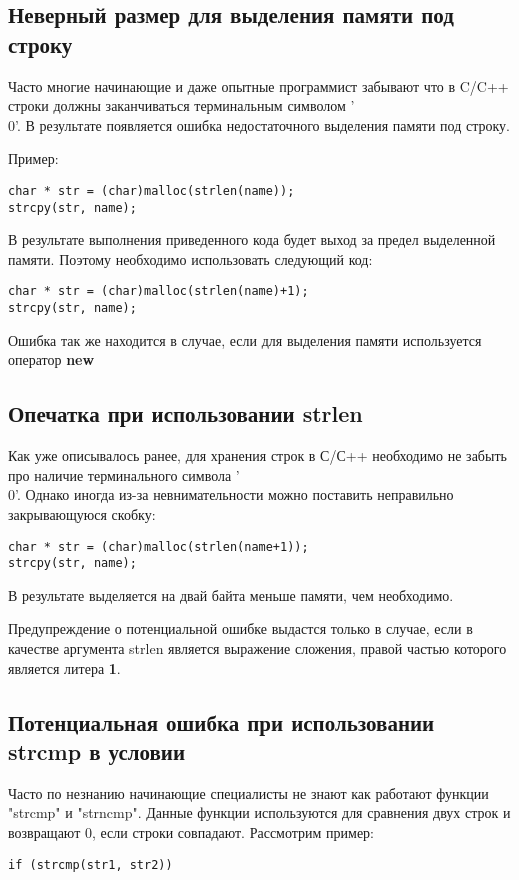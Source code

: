 \subsection{Неверный размер для выделения памяти под строку}
\label{sec:allocStr}
Часто многие начинающие и даже опытные программист забывают что в C/C++ строки должны заканчиваться
терминальным символом '\\0'. В результате появляется ошибка недостаточного выделения памяти под строку.

Пример:
\begin{lstlisting}
char * str = (char)malloc(strlen(name));
strcpy(str, name);
\end{lstlisting}

В результате выполнения приведенного кода будет выход за предел выделенной памяти. Поэтому необходимо
использовать следующий код:
\begin{lstlisting}
char * str = (char)malloc(strlen(name)+1);
strcpy(str, name);
\end{lstlisting}

Ошибка так же находится в случае, если для выделения памяти используется оператор \textbf{new}

\subsection{Опечатка при использовании strlen}
\label{sec:strlen}
Как уже описывалось ранее, для хранения строк в С/С++ необходимо не забыть про наличие терминального
символа '\\0'. Однако иногда из-за невнимательности можно поставить неправильно закрывающуюся скобку:
\begin{lstlisting}
char * str = (char)malloc(strlen(name+1));
strcpy(str, name);
\end{lstlisting}

В результате выделяется на двай байта меньше памяти, чем необходимо. 

Предупреждение о потенциальной ошибке выдастся только в случае, если в качестве аргумента
strlen является выражение сложения, правой частью которого является литера \textbf{1}.

\subsection{Потенциальная ошибка при использовании strcmp в условии}
\label{sec:strcmp}
Часто по незнанию начинающие специалисты не знают как работают функции "strcmp" и "strncmp".
Данные функции используются для сравнения двух строк и возвращают 0, если строки совпадают.
Рассмотрим пример:
\begin{lstlisting}
if (strcmp(str1, str2))
\end{lstlisting}
 
